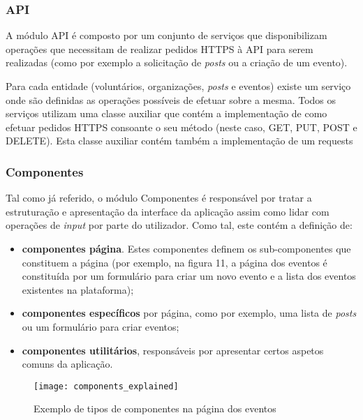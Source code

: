 \subsubsection{API}

A módulo API é composto por um conjunto de serviços que disponibilizam operações que necessitam de realizar pedidos HTTPS à API para serem realizadas (como por exemplo a solicitação de \textit{posts} ou a criação de um evento).

\par \medskip

Para cada entidade (voluntários, organizações, \textit{posts} e eventos) existe um serviço onde são definidas as operações possíveis de efetuar sobre a mesma. Todos os serviços utilizam uma classe auxiliar que contém a implementação de como efetuar pedidos HTTPS consoante o seu método (neste caso, GET, PUT, POST e DELETE). Esta classe auxiliar contém também a implementação de um requests

\subsubsection{Componentes}

Tal como já referido, o módulo Componentes é responsável por tratar a estruturação e apresentação da interface da aplicação assim como lidar com operações de \textit{input} por parte do utilizador. Como tal, este contém a definição de:

\begin{itemize}
	\item \textbf{componentes página}. Estes componentes definem os sub-componentes que constituem a página (por exemplo, na figura 11, a página dos eventos é constituída por um formulário para criar um novo evento e a lista dos eventos existentes na plataforma);
	\item \textbf{componentes específicos} por página, como por exemplo, uma lista de \textit{posts} ou um formulário para criar eventos;
	\item \textbf{componentes utilitários}, responsáveis por apresentar certos aspetos comuns da aplicação.
\end{itemize}

\begin{figure}[h]
	\centering
	\texttt{[image: components\_explained]}
	\caption{Exemplo de tipos de componentes na página dos eventos}
\end{figure}

\bigskip

